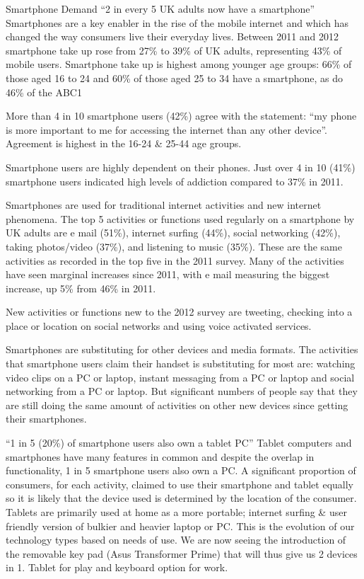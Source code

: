 \documentclass[letterpaper,10pt,openany,oneside,english]{sphinxmanual}
\begin{document}
Smartphone Demand
“2 in every 5 UK adults now have a smartphone”
Smartphones are a key enabler in the rise of the mobile internet and which has changed the way
consumers live their everyday lives.
Between 2011 and 2012 smartphone take up rose from 27\% to 39\% of UK adults, representing
43\% of mobile users. Smartphone take up is highest among younger age groups: 66\% of those
aged 16 to 24 and 60\% of those aged 25 to 34 have a smartphone, as do 46\% of the ABC1

More than 4 in 10 smartphone users (42\%) agree with the statement: “my phone is more
important to me for accessing the internet than any other device”. Agreement is highest in the
16-24 \& 25-44 age groups.

Smartphone users are highly dependent on their phones. Just over 4 in 10 (41\%) smartphone
users indicated high levels of addiction compared to 37\% in 2011.

Smartphones are used for traditional internet activities and new internet phenomena. The top 5
activities or functions used regularly on a smartphone by UK adults are e mail (51\%), internet
surfing (44\%), social networking (42\%), taking photos/video (37\%), and listening to music (35\%).
These are the same activities as recorded in the top five in the 2011 survey. Many of the
activities have seen marginal increases since 2011, with e mail measuring the biggest increase,
up 5\% from 46\% in 2011.

New activities or functions new to the 2012 survey are tweeting, checking into a place or
location on social networks and using voice activated services.

Smartphones are substituting for other devices and media formats. The activities that
smartphone users claim their handset is substituting for most are: watching video clips on a PC
or laptop, instant messaging from a PC or laptop and social networking from a PC or laptop.
But significant numbers of people say that they are still doing the same amount of activities on
other new devices since getting their smartphones.

“1 in 5 (20\%) of smartphone users also own a tablet PC”
Tablet computers and smartphones have many features in common and despite the overlap in
functionality, 1 in 5 smartphone users also own a PC. A significant proportion of consumers, for
each activity, claimed to use their smartphone and tablet equally so it is likely that the device
used is determined by the location of the consumer. Tablets are primarily used at home as a
more portable; internet surfing \& user friendly version of bulkier and heavier laptop or PC. This
is the evolution of our technology types based on needs of use. We are now seeing the
introduction of the removable key pad (Asus Transformer Prime) that will thus give us 2 devices
in 1. Tablet for play and keyboard option for work.
\end{document}
